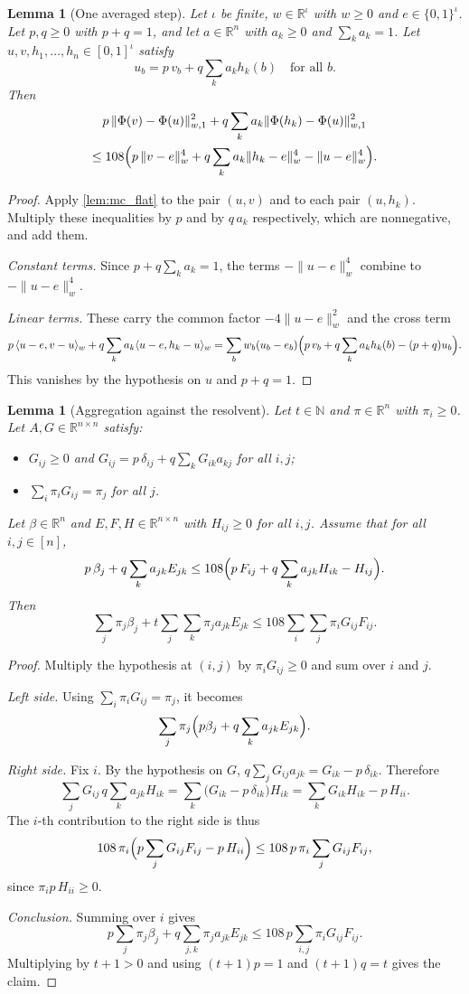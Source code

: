 \documentclass[11pt]{article}
\newtheorem{lemma}[theorem]{Lemma}
\theoremstyle{definition}
\theoremstyle{remark}
\newcommand{\R}{\mathbb{R}}
\newcommand{\N}{\mathbb{N}}
\newcommand{\wn}[1]{\lVert #1\rVert_{w,1}}
\newcommand{\hn}[1]{\lVert #1\rVert_{w}}
\newcommand{\ip}[2]{\langle #1,#2\rangle_{w}}
\begin{document}
\begin{lemma}[One averaged step]\label{lem:mc_one_step}
Let $\iota$ be finite, $w\in\R^\iota$ with $w\ge0$ and $e\in\{0,1\}^\iota$. Let $p,q\ge0$ with $p+q=1$, and let $a\in\R^n$ with $a_k\ge0$ and $\sum_ka_k=1$. Let $u,v,h_1,\dots,h_n\in[0,1]^\iota$ satisfy
\[
u_b=p\,v_b+q\sum_ka_kh_k(b)\quad\text{for all } b .
\]
Then
\begin{multline*}
p\,\wn{\Phi(v)-\Phi(u)}^2+q\sum_ka_k\wn{\Phi(h_k)-\Phi(u)}^2\\
\le108\Bigl(p\,\hn{v-e}^4+q\sum_ka_k\hn{h_k-e}^4-\hn{u-e}^4\Bigr).
\end{multline*}
\end{lemma}
\begin{proof}
Apply \cref{lem:mc_flat} to the pair $(u,v)$ and to each pair $(u,h_k)$. Multiply these inequalities by $p$ and by $q\,a_k$ respectively, which are nonnegative, and add them.

\emph{Constant terms.} Since $p+q\sum_ka_k=1$, the terms $-\hn{u-e}^4$ combine to $-\hn{u-e}^4$.

\emph{Linear terms.} These carry the common factor $-4\hn{u-e}^2$ and the cross term
\[
p\,\ip{u-e}{v-u}+q\sum_ka_k\ip{u-e}{h_k-u}
=\sum_bw_b(u_b-e_b)\Bigl(p\,v_b+q\sum_ka_kh_k(b)-(p+q)u_b\Bigr).
\]
This vanishes by the hypothesis on $u$ and $p+q=1$.
\end{proof}

\begin{lemma}[Aggregation against the resolvent]\label{lem:mc_aggregate}
Let $t\in\N$ and $\pi\in\R^n$ with $\pi_i\ge0$. Let $A,G\in\R^{n\times n}$ satisfy:
\begin{itemize}
\item $G_{ij}\ge0$ and $G_{ij}=p\,\delta_{ij}+q\sum_kG_{ik}a_{kj}$ for all $i,j$;
\item $\sum_i\pi_iG_{ij}=\pi_j$ for all $j$.
\end{itemize}
Let $\beta\in\R^n$ and $E,F,H\in\R^{n\times n}$ with $H_{ij}\ge0$ for all $i,j$. Assume that for all $i,j\in[n]$,
\[
p\,\beta_j+q\sum_ka_{jk}E_{jk}\le108\Bigl(p\,F_{ij}+q\sum_ka_{jk}H_{ik}-H_{ij}\Bigr).
\]
Then
\[
\sum_j\pi_j\beta_j+t\sum_j\sum_k\pi_ja_{jk}E_{jk}\le108\sum_i\sum_j\pi_iG_{ij}F_{ij}.
\]
\end{lemma}
\begin{proof}
Multiply the hypothesis at $(i,j)$ by $\pi_iG_{ij}\ge0$ and sum over $i$ and $j$.

\emph{Left side.} Using $\sum_i\pi_iG_{ij}=\pi_j$, it becomes
\[
\sum_j\pi_j\Bigl(p\beta_j+q\sum_ka_{jk}E_{jk}\Bigr).
\]

\emph{Right side.} Fix $i$. By the hypothesis on $G$, $q\sum_jG_{ij}a_{jk}=G_{ik}-p\,\delta_{ik}$. Therefore
\[
\sum_jG_{ij}\,q\sum_ka_{jk}H_{ik}=\sum_k\bigl(G_{ik}-p\,\delta_{ik}\bigr)H_{ik}=\sum_kG_{ik}H_{ik}-p\,H_{ii}.
\]
The $i$-th contribution to the right side is thus
\[
108\,\pi_i\Bigl(p\sum_jG_{ij}F_{ij}-p\,H_{ii}\Bigr)\le108\,p\,\pi_i\sum_jG_{ij}F_{ij},
\]
since $\pi_ip\,H_{ii}\ge0$.

\emph{Conclusion.} Summing over $i$ gives
\[
p\sum_j\pi_j\beta_j+q\sum_{j,k}\pi_ja_{jk}E_{jk}\le108\,p\sum_{i,j}\pi_iG_{ij}F_{ij}.
\]
Multiplying by $t+1>0$ and using $(t+1)p=1$ and $(t+1)q=t$ gives the claim.
\end{proof}
\end{document}

